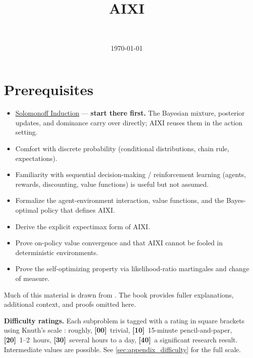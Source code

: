 \documentclass[fontsize=11pt, parskip=half]{scrartcl}
\begin{document}
\title{AIXI}
\author{\\ }
\date{\today}
\maketitle

\section*{Prerequisites}

\begin{itemize}
    \item \href{/agency/solomonoff-induction}{Solomonoff Induction} ---
    \textbf{start there first.} The Bayesian mixture, posterior updates, and
    dominance carry over directly; AIXI reuses them in the action setting.
    \item Comfort with discrete probability (conditional distributions, chain rule,
    expectations).
    \item Familiarity with sequential decision-making / reinforcement learning
    (agents, rewards, discounting, value functions) is useful but not assumed.
\end{itemize}

\begin{learningoutcomes}
  \begin{itemize}
    \item Formalize the agent-environment interaction, value functions, and the Bayes-optimal policy that defines AIXI.
    \item Derive the explicit expectimax form of AIXI.
    \item Prove on-policy value convergence and that AIXI cannot be fooled in deterministic environments.
    \item Prove the self-optimizing property via likelihood-ratio martingales and change of measure.
  \end{itemize}
\end{learningoutcomes}

\medskip
\noindent
Much of this material is drawn from \cite{Hutter:24uaibook2}. 
The book provides fuller explanations, additional context, and proofs omitted here.

\medskip
\noindent
\textbf{Difficulty ratings.} Each subproblem is tagged with a rating in square brackets using Knuth's scale \cite{Knuth:73a}: roughly, \textbf{[00]}~trivial, \textbf{[10]}~15-minute pencil-and-paper, \textbf{[20]}~1--2~hours, \textbf{[30]}~several hours to a day, \textbf{[40]}~a significant research result. Intermediate values are possible. See \cref{sec:appendix_difficulty} for the full scale. 
\end{document}
